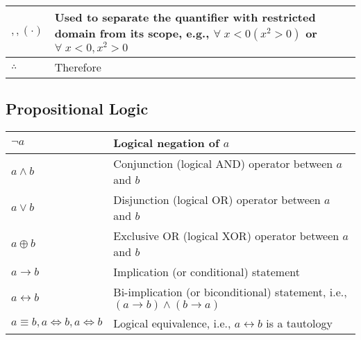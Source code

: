 \documentclass{article}
\begin{document}
\begin{xltabular}{\textwidth}{XX}
	\(, , \left( \cdot \right)\) & Used to separate the quantifier with restricted domain from its scope, e.g., \(\forall \; x < 0 \left( x^{2} > 0 \right)\) or \(\forall \; x < 0, x^{2} > 0\) \cite{grahamConcreteMathematicsFoundation1989} \\ \hline
	\(\therefore\)               & Therefore \cite{grahamConcreteMathematicsFoundation1989}                                                                                                                                                     \\
\end{xltabular}

\subsection{Propositional Logic}
\begin{xltabular}{\textwidth}{XX}
	\(\lnot a\)                                    & Logical negation of \(a\) \cite{rosenDiscreteMathematicsIts2011}                                                                                       \\ \hline
	\(a \wedge b\)                                 & Conjunction (logical AND) operator between \(a\) and \(b\)\cite{rosenDiscreteMathematicsIts2011}                                                       \\ \hline
	\(a \vee b\)                                   & Disjunction (logical OR) operator between \(a\) and \(b\)\cite{rosenDiscreteMathematicsIts2011}                                                        \\ \hline
	\(a \oplus b\)                                 & Exclusive OR (logical XOR) operator between \(a\) and \(b\)\cite{rosenDiscreteMathematicsIts2011}                                                      \\ \hline
	\(a \rightarrow b\)                            & Implication (or conditional) statement\cite{rosenDiscreteMathematicsIts2011}                                                                           \\ \hline
	\(a \leftrightarrow b\)                        & Bi-implication (or biconditional) statement, i.e., \(\left( a \rightarrow b \right) \wedge (b \rightarrow a )\) \cite{rosenDiscreteMathematicsIts2011} \\ \hline
	\(a \equiv b, a \iff b, a \Leftrightarrow b \) & Logical equivalence, i.e., \(a \leftrightarrow b\) is a tautology\cite{rosenDiscreteMathematicsIts2011}                                                \\
\end{xltabular}
\end{document}
